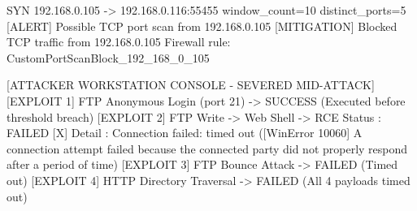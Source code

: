 \begin{logbox}
SYN 192.168.0.105 -> 192.168.0.116:55455  window_count=10  distinct_ports=5
[ALERT] Possible TCP port scan from 192.168.0.105
[MITIGATION] Blocked TCP traffic from 192.168.0.105
             Firewall rule: CustomPortScanBlock_192_168_0_105

[ATTACKER WORKSTATION CONSOLE - SEVERED MID-ATTACK]
[EXPLOIT 1] FTP Anonymous Login (port 21) -> SUCCESS (Executed before threshold breach)
[EXPLOIT 2] FTP Write -> Web Shell -> RCE
  Status : FAILED [X]
  Detail : Connection failed: timed out ([WinError 10060] A connection attempt failed because the connected party did not properly respond after a period of time)
[EXPLOIT 3] FTP Bounce Attack -> FAILED (Timed out)
[EXPLOIT 4] HTTP Directory Traversal -> FAILED (All 4 payloads timed out)
\end{logbox}
